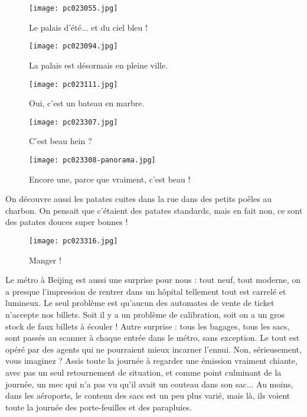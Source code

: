 \documentclass{book}
\begin{document}
\begin{figure}[H]
\centering
\texttt{[image: pc023055.jpg]}
\caption*{ Le palais d'été... et du ciel bleu !}
\end{figure}


\begin{figure}[H]
\centering
\texttt{[image: pc023094.jpg]}
\caption*{ La palais est désormais en pleine ville.}
\end{figure}


\begin{figure}[H]
\centering
\texttt{[image: pc023111.jpg]}
\caption*{ Oui, c'est un bateau en marbre.}
\end{figure}


\begin{figure}[H]
\centering
\texttt{[image: pc023307.jpg]}
\caption*{ C'est beau hein ?}
\end{figure}


\begin{figure}[H]
\centering
\texttt{[image: pc023308-panorama.jpg]}
\caption*{ Encore une, parce que vraiment, c'est beau !}
\end{figure}

On découvre aussi les patates cuites dans la rue dans des petits poêles au charbon. On pensait que c'étaient des patates standards, mais en fait non, ce sont des patates douces super bonnes !


\begin{figure}[H]
\centering
\texttt{[image: pc023316.jpg]}
\caption*{ Manger !}
\end{figure}

Le métro à Beijing est aussi une surprise pour nous : tout neuf, tout moderne, on a presque l'impression de rentrer dans un hôpital tellement tout est carrelé et lumineux. Le seul problème est qu'aucun des automates de vente de ticket n'accepte nos billets. Soit il y a un problème de calibration, soit on a un gros stock de faux billets à écouler ! Autre surprise : tous les bagages, tous les sacs, sont passés au scanner à chaque entrée dans le métro, sans exception. Le tout est opéré par des agents qui ne pourraient mieux incarner l'ennui. Non, sérieusement, vous imaginez ? Assis toute la journée à regarder une émission vraiment chiante, avec pas un seul retournement de situation, et comme point culminant de la journée, un mec qui n'a pas vu qu'il avait un couteau dans son sac... Au moins, dans les aéroports, le contenu des sacs est un peu plus varié, mais là, ils voient toute la journée des porte-feuilles et des parapluies.
\end{document}

